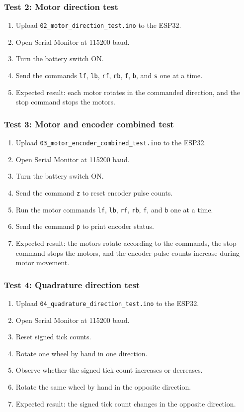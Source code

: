 \documentclass[12pt]{article}
\begin{document}
\subsubsection{Test 2: Motor direction test}
\begin{enumerate}
    \item Upload \texttt{02\_motor\_direction\_test.ino} to the ESP32.
    \item Open Serial Monitor at 115200 baud.
    \item Turn the battery switch ON.
    \item Send the commands \texttt{lf}, \texttt{lb}, \texttt{rf}, \texttt{rb}, \texttt{f}, \texttt{b}, and \texttt{s} one at a time.
    \item Expected result: each motor rotates in the commanded direction, and the stop command stops the motors.
\end{enumerate}
\clearpage
\subsubsection{Test 3: Motor and encoder combined test}
\begin{enumerate}
    \item Upload \texttt{03\_motor\_encoder\_combined\_test.ino} to the ESP32.
    \item Open Serial Monitor at 115200 baud.
    \item Turn the battery switch ON.
    \item Send the command \texttt{z} to reset encoder pulse counts.
    \item Run the motor commands \texttt{lf}, \texttt{lb}, \texttt{rf}, \texttt{rb}, \texttt{f}, and \texttt{b} one at a time.
    \item Send the command \texttt{p} to print encoder status.
    \item Expected result: the motors rotate according to the commands, the stop command stops the motors, and the encoder pulse counts increase during motor movement.
\end{enumerate}
\subsubsection{Test 4: Quadrature direction test}
\begin{enumerate}
    \item Upload \texttt{04\_quadrature\_direction\_test.ino} to the ESP32.
    \item Open Serial Monitor at 115200 baud.
    \item Reset signed tick counts.
    \item Rotate one wheel by hand in one direction.
    \item Observe whether the signed tick count increases or decreases.
    \item Rotate the same wheel by hand in the opposite direction.
    \item Expected result: the signed tick count changes in the opposite direction.
\end{enumerate}
\end{document}
